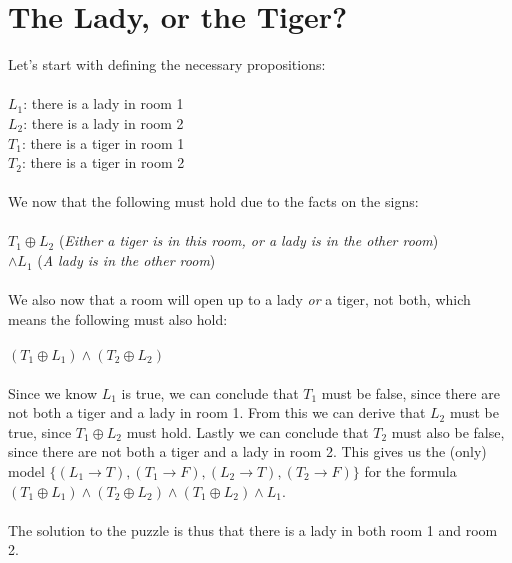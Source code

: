 \documentclass[]{article}
\begin{document}
\section{The Lady, or the Tiger?}
Let's start with defining the necessary propositions:\\
\\
\textbf{$L_1$}: there is a lady in room 1\\
\textbf{$L_2$}: there is a lady in room 2\\
\textbf{$T_1$}: there is a tiger in room 1\\
\textbf{$T_2$}: there is a tiger in room 2\\
\\
We now that the following must hold due to the facts on the signs:\\
\\
$T_1 \oplus L_2 $ (\textit{Either a tiger is in this room, or a lady is in the other room}) \\
$\wedge L_1$ (\textit{A lady is in the other room}) \\
\\
We also now that a room will open up to a lady \textit{or} a tiger, not both, which means the following must also hold:\\
\\
$(T_1 \oplus L_1) \wedge (T_2 \oplus L_2)$\\
\\
Since we know $L_1$ is true, we can conclude that $T_1$ must be false, since there are not both a tiger and a lady in room 1. From this we can derive that $L_2$ must be true, since $T_1 \oplus L_2 $ must hold. Lastly we can conclude that $T_2$ must also be false, since there are not both a tiger and a lady in room 2. This gives us the (only) model $\{(L_1 \rightarrow T), (T_1 \rightarrow F), (L_2 \rightarrow T), (T_2 \rightarrow F)\}$ for the formula $(T_1 \oplus L_1) \wedge (T_2 \oplus L_2) \wedge (T_1 \oplus L_2) \wedge L_1$.\\
\\
The solution to the puzzle is thus that there is a lady in both room 1 and room 2. 
\end{document}
